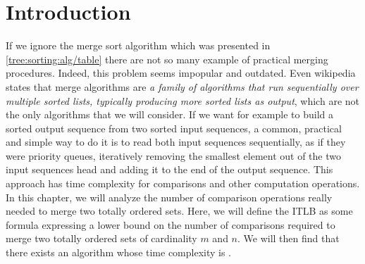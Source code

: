 \section{Introduction}
\label{tree:merging:intro}

If we ignore the merge sort algorithm which was presented in \ref{tree:sorting:alg/table} there are not so many example of practical merging procedures. Indeed, this problem seems impopular and outdated. Even wikipedia states that merge algorithms are \emph{a family of algorithms that run sequentially over multiple sorted lists, typically producing more sorted lists as output}, which are not the only algorithms that we will consider. If we want for example to build a sorted output sequence from two sorted input sequences, a common, practical and simple way to do it is to read both input sequences sequentially, as if they were priority queues, iteratively removing the smallest element out of the two input sequences head and adding it to the end of the output sequence. This approach has  time complexity for comparisons and other computation operations. In this chapter, we will analyze the number of comparison operations really needed to merge two totally ordered sets. Here, we will define the ITLB as some formula expressing a lower bound on the number of comparisons required to merge two totally ordered sets of cardinality $m$ and $n$. We will then find that there exists an algorithm whose time complexity is .


